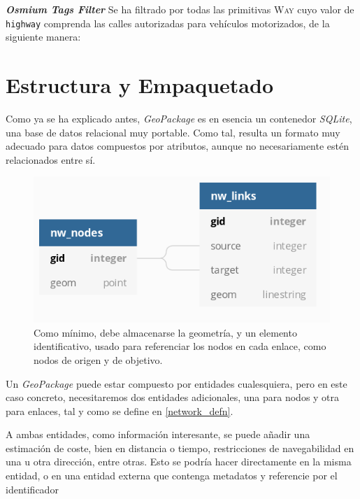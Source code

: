 \begin{minipage}{\textwidth}
	\textbf{\textit{Osmium Tags Filter}} Se ha filtrado por todas las primitivas \textsc{Way} cuyo valor de \texttt{highway} comprenda las calles autorizadas para vehículos motorizados, de la siguiente manera:
\end{minipage}

\section{Estructura y Empaquetado}
	Como ya se ha explicado antes, \textit{GeoPackage} es en esencia un contenedor \textit{SQLite}, una base de datos relacional muy portable. Como tal, resulta un formato muy adecuado para datos compuestos por atributos, aunque no necesariamente estén relacionados entre sí.

	\begin{figure}[htbp]
		\centering
		\includegraphics[width=.7\textwidth]{img/network_defn.png}
		\caption[Definición mínima de las entidades de una red]{Como mínimo, debe almacenarse la geometría, y un elemento identificativo, usado para referenciar los nodos en cada enlace, como nodos de origen y de objetivo.}
		\label{network_defn}
	\end{figure}

	Un \textit{GeoPackage} puede estar compuesto por entidades cualesquiera, pero en este caso concreto, necesitaremos dos entidades adicionales, una para nodos y otra para enlaces, tal y como se define en \autoref{network_defn}.
	
	A ambas entidades, como información interesante, se puede añadir una estimación de coste, bien en distancia o tiempo, restricciones de navegabilidad en una u otra dirección, entre otras. Esto se podría hacer directamente en la misma entidad, o en una entidad externa que contenga metadatos y referencie por el identificador
	
